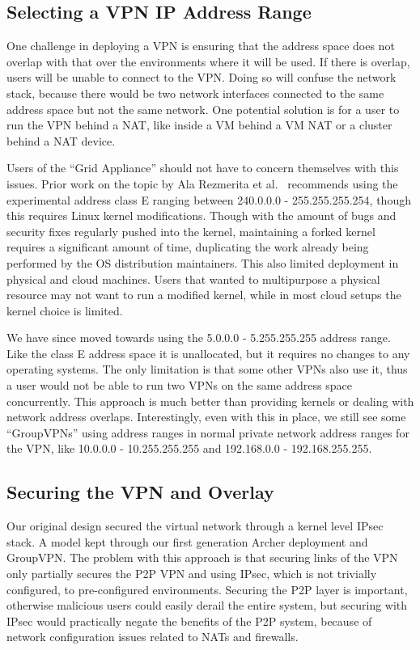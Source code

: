\documentclass[conference]{IEEEtran}
\begin{document}
\subsection{Selecting a VPN IP Address Range}

One challenge in deploying a VPN is ensuring that the address space does not
overlap with that over the environments where it will be used.  If there is
overlap, users will be unable to connect to the VPN.  Doing so will confuse the
network stack, because there would be two network interfaces connected to the
same address space but not the same network.  One potential solution is for a
user to run the VPN behind a NAT, like inside a VM behind a VM NAT or a cluster
behind a NAT device.

Users of the ``Grid Appliance'' should not have to concern themselves with this
issues.  Prior work on the topic by Ala Rezmerita et al.~\cite{pvc} recommends
using the experimental address class E ranging between 240.0.0.0 -
255.255.255.254, though this requires Linux kernel modifications.  Though with
the amount of bugs and security fixes regularly pushed into the kernel,
maintaining a forked kernel requires a significant amount of time, duplicating
the work already being performed by the OS distribution maintainers.  This also
limited deployment in physical and cloud machines.  Users that wanted to
multipurpose a physical resource may not want to run a modified kernel, while
in most cloud setups the kernel choice is limited.

We have since moved towards using the 5.0.0.0 - 5.255.255.255 address range.
Like the class E address space it is unallocated, but it requires no changes to
any operating systems.  The only limitation is that some other VPNs also use
it, thus a user would not be able to run two VPNs on the same address space
concurrently.  This approach is much better than providing kernels or dealing
with network address overlaps.  Interestingly, even with this in place, we
still see some ``GroupVPNs''  using address ranges in normal private network
address ranges for the VPN, like 10.0.0.0 - 10.255.255.255 and 192.168.0.0 -
192.168.255.255.

\subsection{Securing the VPN and Overlay}

Our original design secured the virtual network through a kernel level IPsec
stack.  A model kept through our first generation Archer deployment and
GroupVPN.  The problem with this approach is that securing links of the VPN
only partially secures the P2P VPN and using IPsec, which is not trivially
configured, to pre-configured environments.  Securing the P2P layer is
important, otherwise malicious users could easily derail the entire system, but
securing with IPsec would practically negate the benefits of the P2P system,
because of network configuration issues related to NATs and firewalls.
\end{document}
